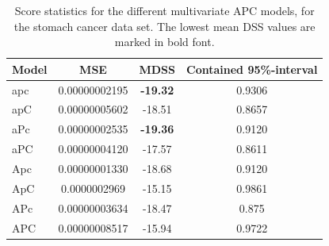 \begin{table}[h!]
    \begin{tabular}{l |c c c }
        Model & MSE & MDSS & Contained 95\%-interval\\
        \hline
        apc    &0.00000002195 &\textbf{-19.32}    &0.9306 \\
        apC    &0.00000005602 &-18.51    &0.8657 \\
        aPc    &0.00000002535 &\textbf{-19.36}    &0.9120 \\
        aPC    &0.00000004120 &-17.57    &0.8611 \\
        Apc    &0.00000001330 &-18.68    &0.9120 \\
        ApC    &0.0000002969  &-15.15    &0.9861 \\
        APc    &0.00000003634 &-18.47    &0.875  \\
        APC    &0.00000008517 &-15.94    &0.9722 \\
    \end{tabular}
    \caption{\label{tab:APC-stomach}Score statistics for the different multivariate APC models, for the stomach cancer data set. The lowest mean DSS values are marked in bold font. }
\end{table}

